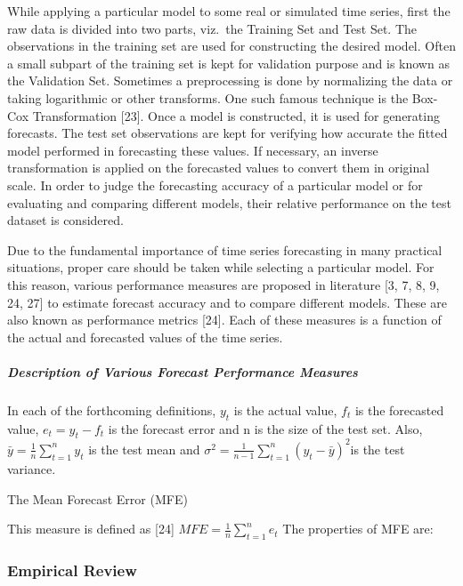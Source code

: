 \documentclass[
  letterpaper,
  DIV=11,
  numbers=noendperiod]{scrartcl}
\let\oldsubparagraph\subparagraph
\renewcommand{\subparagraph}[1]{\oldsubparagraph{#1}\mbox{}}
\begin{document}
While applying a particular model to some real or simulated time series,
first the raw data is divided into two parts, viz.~the Training Set and
Test Set. The observations in the training set are used for constructing
the desired model. Often a small subpart of the training set is kept for
validation purpose and is known as the Validation Set. Sometimes a
preprocessing is done by normalizing the data or taking logarithmic or
other transforms. One such famous technique is the Box-Cox
Transformation {[}23{]}. Once a model is constructed, it is used for
generating forecasts. The test set observations are kept for verifying
how accurate the fitted model performed in forecasting these values. If
necessary, an inverse transformation is applied on the forecasted values
to convert them in original scale. In order to judge the forecasting
accuracy of a particular model or for evaluating and comparing different
models, their relative performance on the test dataset is considered.

Due to the fundamental importance of time series forecasting in many
practical situations, proper care should be taken while selecting a
particular model. For this reason, various performance measures are
proposed in literature {[}3, 7, 8, 9, 24, 27{]} to estimate forecast
accuracy and to compare different models. These are also known as
performance metrics {[}24{]}. Each of these measures is a function of
the actual and forecasted values of the time series.

\hypertarget{description-of-various-forecast-performance-measures}{%
\subparagraph{Description of Various Forecast Performance
Measures}\label{description-of-various-forecast-performance-measures}}

In each of the forthcoming definitions, \(y_{t }\) is the actual value,
\(f_{t}\) is the forecasted value, \(e_{t} = y_{t} - f_{t}\) is the
forecast error and n is the size of the test set. Also,
\(\displaystyle \bar{y} = \frac{1}{n}\sum_{t=1}^{n}y_{t}\) is the test
mean and
\(\displaystyle \sigma^{2} = \frac{1}{n-1}\sum_{t=1}^{n}(y_{t}-\bar{y})^{2}\)is
the test variance.

The Mean Forecast Error (MFE)

This measure is defined as {[}24{]}
\(\displaystyle MFE = \frac{1}{n}\sum_{t=1}^{n}e_{t}\) The properties of
MFE are:

\hypertarget{empirical-review}{%
\subsubsection{Empirical Review}\label{empirical-review}}
\end{document}
